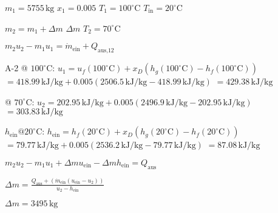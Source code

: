 \( m_1 = 5755 \, \text{kg} \)  
\( x_1 = 0.005 \)  
\( T_1 = 100^\circ \text{C} \)  
\( T_{\text{in}} = 20^\circ \text{C} \)  

\( m_2 = m_1 + \Delta m \)  
\( \Delta m \)  
\( T_2 = 70^\circ \text{C} \)  

\( m_2 u_2 - m_1 u_1 = \dot{m}_{\text{ein}} + Q_{\text{aus,12}} \)  

A-2 @ \( 100^\circ \text{C} \):  
\( u_1 = u_f(100^\circ \text{C}) + x_D \left( h_g(100^\circ \text{C}) - h_f(100^\circ \text{C}) \right) \)  
\( = 418.99 \, \text{kJ/kg} + 0.005 \left( 2506.5 \, \text{kJ/kg} - 418.99 \, \text{kJ/kg} \right) \)  
\( = 429.38 \, \text{kJ/kg} \)  

@ \( 70^\circ \text{C} \):  
\( u_2 = 202.95 \, \text{kJ/kg} + 0.005 \left( 2496.9 \, \text{kJ/kg} - 202.95 \, \text{kJ/kg} \right) \)  
\( = 303.83 \, \text{kJ/kg} \)  

\( h_{\text{ein}} @ 20^\circ \text{C} \):  
\( h_{\text{ein}} = h_f(20^\circ \text{C}) + x_D \left( h_g(20^\circ \text{C}) - h_f(20^\circ \text{C}) \right) \)  
\( = 79.77 \, \text{kJ/kg} + 0.005 \left( 2536.2 \, \text{kJ/kg} - 79.77 \, \text{kJ/kg} \right) \)  
\( = 87.08 \, \text{kJ/kg} \)  

\( m_2 u_2 - m_1 u_1 + \Delta m u_{\text{ein}} - \Delta m h_{\text{ein}} = Q_{\text{aus}} \)  

\( \Delta m = \frac{Q_{\text{aus}} + (\dot{m}_{\text{ein}} (u_{\text{ein}} - u_2))}{u_2 - h_{\text{ein}}} \)  

\( \Delta m = 3495 \, \text{kg} \)